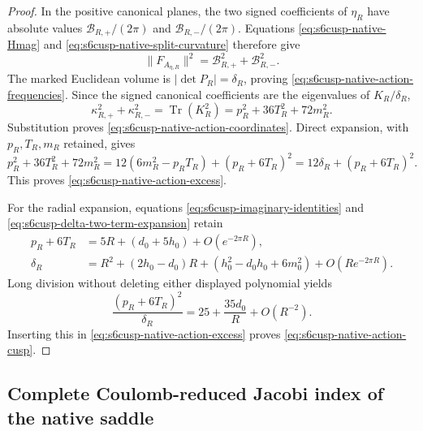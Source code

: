 \begin{proof}
In the positive canonical planes, the two signed coefficients of \(\eta_R\)
have absolute values
\(\mathcal B_{R,+}/(2\pi)\) and
\(\mathcal B_{R,-}/(2\pi)\).  Equations
\eqref{eq:s6cusp-native-Hmag} and
\eqref{eq:s6cusp-native-split-curvature} therefore give
\begin{equation*}
 \lVert F_{A_{\eta,R}}\rVert^2
 =\mathcal B_{R,+}^2+\mathcal B_{R,-}^2.
\end{equation*}
The marked Euclidean volume is
\(|\det P_R|=\delta_R\), proving
\eqref{eq:s6cusp-native-action-frequencies}.  Since the signed canonical
coefficients are the eigenvalues of \(K_R/\delta_R\),
\begin{equation*}
 \kappa_{R,+}^2+\kappa_{R,-}^2
 =\operatorname{Tr}(K_R^2)
 =p_R^2+36T_R^2+72m_R^2.
\end{equation*}
Substitution proves \eqref{eq:s6cusp-native-action-coordinates}.  Direct
expansion, with \(p_R,T_R,m_R\) retained, gives
\begin{equation}\label{eq:s6cusp-native-action-coordinate-decomposition}
 p_R^2+36T_R^2+72m_R^2
 =12(6m_R^2-p_RT_R)+(p_R+6T_R)^2
 =12\delta_R+(p_R+6T_R)^2.
\end{equation}
This proves \eqref{eq:s6cusp-native-action-excess}.

For the radial expansion, equations
\eqref{eq:s6cusp-imaginary-identities} and
\eqref{eq:s6cusp-delta-two-term-expansion} retain
\begin{align*}
 p_R+6T_R
 &=5R+(d_0+5h_0)+O(e^{-2\pi R}),\\
 \delta_R
 &=R^2+(2h_0-d_0)R
   +(h_0^2-d_0h_0+6m_0^2)+O(Re^{-2\pi R}).
\end{align*}
Long division without deleting either displayed polynomial yields
\begin{equation*}
 \frac{(p_R+6T_R)^2}{\delta_R}
 =25+\frac{35d_0}{R}+O(R^{-2}).
\end{equation*}
Inserting this in \eqref{eq:s6cusp-native-action-excess} proves
\eqref{eq:s6cusp-native-action-cusp}.
\end{proof}

\subsection{Complete Coulomb-reduced Jacobi index of the native saddle}
\label{subsec:s6cusp-native-jacobi-index}

